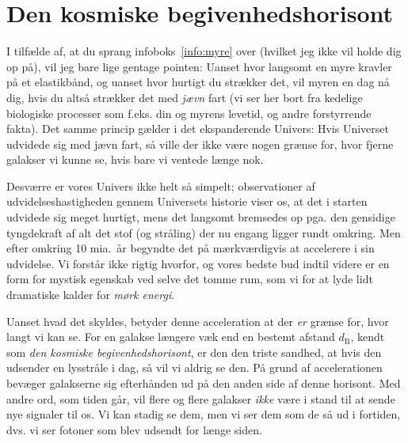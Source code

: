 \documentclass[useAMS,danish]{aa}
\begin{document}
\section{Den kosmiske begivenhedshorisont}
\label{sec:dE}
I tilfælde af, at du sprang infoboks~\ref{info:myre} over (hvilket jeg ikke vil holde dig op på), vil jeg bare lige gentage pointen:
Uanset hvor langsomt en myre kravler på et elastikbånd, og uanset hvor hurtigt du strækker det, vil myren en dag nå dig, hvis du altså strækker det med \emph{jævn} fart (vi ser her bort fra kedelige biologiske processer som f.eks. din og myrens levetid, og andre forstyrrende fakta).
Det samme princip gælder i det ekspanderende Univers:
Hvis Universet udvidede sig med jævn fart, så ville der ikke være nogen grænse for, hvor fjerne galakser vi kunne se, hvis bare vi ventede længe nok.

Desværre er vores Univers ikke helt så simpelt; observationer af udvidelseshastigheden gennem Universets historie viser os, at det i starten udvidede sig meget hurtigt, mens det langsomt bremsedes op pga. den gensidige tyngdekraft af alt det stof (og stråling) der nu engang ligger rundt omkring.
Men efter omkring 10 mia.~år begyndte det på mærkværdigvis at accelerere i sin udvidelse.
Vi forstår ikke rigtig hvorfor, og vores bedste bud indtil videre er en form for mystisk egenskab ved selve det tomme rum, som vi for at lyde lidt dramatiske kalder for \emph{mørk energi}.

Uanset hvad det skyldes, betyder denne acceleration at der \emph{er} grænse for, hvor langt vi kan se.
For en galakse længere væk end en bestemt afstand $d_\mathrm{B}$, kendt som \emph{den kosmiske begivenhedshorisont}, er den den triste sandhed, at hvis den udsender en lysstråle i dag, så vil vi aldrig se den.
På grund af accelerationen bevæger galakserne sig efterhånden ud på den anden side af denne horisont.
Med andre ord, som tiden går, vil flere og flere galakser \emph{ikke} være i stand til at sende nye signaler til os.
Vi kan stadig se dem, men vi ser dem som de så ud i fortiden, dvs. vi ser fotoner som blev udsendt for længe siden.
\end{document}

